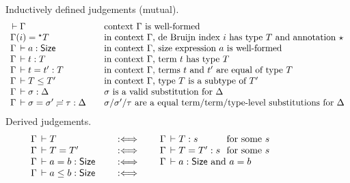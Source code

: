 \begin{figure}[htbp]
\flushleft
\fleq
\hrulefill
\\[1ex]
Inductively defined judgements (mutual).
\[
\begin{array}{l@{\qquad}l}
  \der \Gamma & \mbox{context $\Gamma$ is well-formed} \\
  \Gamma(i) = \eann T & \mbox{in context $\Gamma$, de Bruijn index $i$ has type $T$ and annotation $\evar$} \\
  \Gamma \der a : \Size & \mbox{in context $\Gamma$, size expression $a$ is well-formed} \\
  \Gamma \der t : T & \mbox{in context $\Gamma$, term $t$ has type $T$} \\
  \Gamma \der t = t' : T & \mbox{in context $\Gamma$, terms $t$ and $t'$ are equal of type $T$} \\
  \Gamma \der T \leq T' & \mbox{in context $\Gamma$, type $T$ is a subtype of $T'$} \\
  \Gamma \der \sigma : \Delta & \mbox{$\sigma$ is a valid substitution for $\Delta$} \\
  \sueq \Gamma \sigma {\sigma'} \tau \Delta & \mbox{$\sigma$/$\sigma'$/$\tau$ are a equal term/term/type-level substitutions for $\Delta$} \\
\end{array}
\]
Derived judgements.
\[
\begin{array}{l@{\qquad}l@{\qquad}l@{~}l}%
  \Gamma \der T & \defas & \Gamma \der T : s & \mforsome s
\\
  \Gamma \der T = T' & \defas & \Gamma \der T = T' : s & \mforsome s
\\
  \Gamma \der a = b : \Size & \defas &
    \multicolumn 2 {@{}l@{\quad}} {\Gamma \der a : \Size \mand a = b}
\\
  \Gamma \der a \leq b : \Size & \defas &

\end{array}\]
\end{figure}
